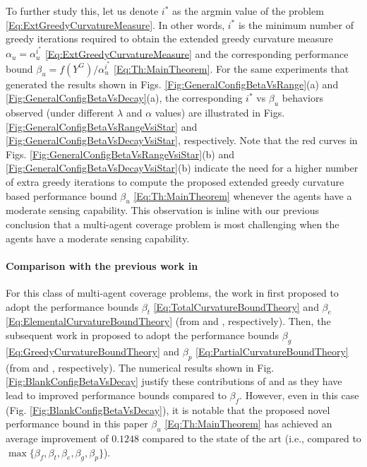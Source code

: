 \documentclass[conference]{IEEEtran}
\begin{document}
To further study this, let us denote $i^*$ as the argmin value of the problem \eqref{Eq:ExtGreedyCurvatureMeasure}. In other words, $i^*$ is the minimum number of greedy iterations required to obtain the extended greedy curvature measure $\alpha_u = \alpha^{i^*}_u$ \eqref{Eq:ExtGreedyCurvatureMeasure} and the corresponding performance bound $\beta_u=f(Y^G)/\alpha^{i^*}_u$ \eqref{Eq:Th:MainTheorem}. For the same experiments that generated the results shown in Figs. \ref{Fig:GeneralConfigBetaVsRange}(a) and \ref{Fig:GeneralConfigBetaVsDecay}(a), the corresponding $i^*$ vs $\beta_u$ behaviors observed (under different $\lambda$ and $\alpha$ values) are illustrated in Figs. \ref{Fig:GeneralConfigBetaVsRangeVsiStar} and  \ref{Fig:GeneralConfigBetaVsDecayVsiStar}, respectively. Note that the red curves in Figs. \ref{Fig:GeneralConfigBetaVsRangeVsiStar}(b) and  \ref{Fig:GeneralConfigBetaVsDecayVsiStar}(b) indicate the need for a higher number of extra greedy iterations to compute the proposed extended greedy curvature based performance bound $\beta_u$ \eqref{Eq:Th:MainTheorem} whenever the agents have a moderate sensing capability. This observation is inline with our previous conclusion that a multi-agent coverage problem is most challenging when the agents have a moderate sensing capability.    




\paragraph*{\textbf{Comparison with the previous work in} \cite{Sun2019,Sun2020}}
For this class of multi-agent coverage problems, the work in \cite{Sun2019} first proposed to adopt the performance bounds $\beta_t$ \eqref{Eq:TotalCurvatureBoundTheory} and $\beta_e$ \eqref{Eq:ElementalCurvatureBoundTheory} (from \cite{Conforti1984} and \cite{Wang2016}, respectively). Then, the subsequent work in \cite{Sun2020} proposed to adopt the performance bounds $\beta_g$ \eqref{Eq:GreedyCurvatureBoundTheory} and $\beta_p$ \eqref{Eq:PartialCurvatureBoundTheory} (from \cite{Conforti1984} and \cite{Liu2018}, respectively). The numerical results shown in Fig. \ref{Fig:BlankConfigBetaVsDecay} justify these contributions of \cite{Sun2019} and \cite{Sun2020} as they have lead to improved performance bounds compared to $\beta_f$. However, even in this case (Fig. \ref{Fig:BlankConfigBetaVsDecay}), it is notable that the proposed novel performance bound in this paper $\beta_u$ \eqref{Eq:Th:MainTheorem} has achieved an average improvement of $0.1248$ compared to the state of the art (i.e., compared to  $\max\{\beta_f,\beta_t,\beta_e,\beta_g,\beta_p\}$).
\end{document}
